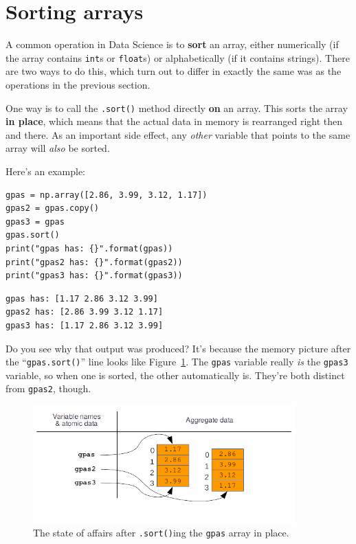 \section{Sorting arrays}

\label{sortingArrays}
A common operation in Data Science is to \textbf{sort} an array, either
numerically (if the array contains \texttt{int}s or \texttt{float}s) or
alphabetically (if it contains strings). There are two ways to do this, which
turn out to differ in exactly the same was as the operations in the previous
section.

One way is to call the \texttt{.sort()} method directly \textbf{on} an array.
This sorts the array \textbf{in place}, which means that the actual data in
memory is rearranged right then and there. As an important side effect, any
\textit{other} variable that points to the same array will \textit{also} be
sorted.

Here's an example:

\begin{Verbatim}[fontsize=\small,samepage=true,frame=single,framesep=3mm]
gpas = np.array([2.86, 3.99, 3.12, 1.17])
gpas2 = gpas.copy()
gpas3 = gpas
gpas.sort()
print("gpas has: {}".format(gpas))
print("gpas2 has: {}".format(gpas2))
print("gpas3 has: {}".format(gpas3))
\end{Verbatim}

\begin{Verbatim}[fontsize=\small,samepage=true,frame=leftline,framesep=5mm,framerule=1mm]
gpas has: [1.17 2.86 3.12 3.99]
gpas2 has: [2.86 3.99 3.12 1.17]
gpas3 has: [1.17 2.86 3.12 3.99]
\end{Verbatim}

Do you see why that output was produced? It's because the memory picture after
the ``\texttt{gpas.sort()}'' line looks like Figure~\ref{fig:dotSortArray}. The
\texttt{gpas} variable really \textit{is} the \texttt{gpas3} variable, so when
one is sorted, the other automatically is. They're both distinct from
\texttt{gpas2}, though.

\begin{figure}[ht]
\centering
\includegraphics[width=0.9\textwidth]{dotSortArray.png}
\caption{The state of affairs after \texttt{.sort()}ing the \texttt{gpas} array in place.}
\label{fig:dotSortArray}
\end{figure}

